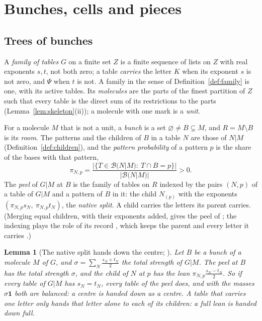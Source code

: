\documentclass[11pt]{article}
\theoremstyle{plain}
\newtheorem{lemma}[prop]{Lemma}
\theoremstyle{definition}
\theoremstyle{remark}
\newcommand{\cB}{\mathcal B}
\begin{document}
\section{Bunches, cells and pieces}\label{sec:bunches}

\subsection{Trees of bunches}

A \emph{family of tables} $G$ on a finite set $Z$ is a finite sequence of lists on $Z$ with real exponents $s,t$, not both zero; a table \emph{carries} the letter $K$ when its exponent $s$ is not zero, and $\Psi$ when $t$ is not. A family in the sense of Definition~\ref{def:family} is one, with its active tables. Its \emph{molecules} are the parts of the finest partition of $Z$ such that every table is the direct sum of its restrictions to the parts (Lemma~\ref{lem:skeleton}(ii)); a molecule with one mark is a \emph{unit}.

For a molecule $M$ that is not a unit, a \emph{bunch} is a set $\varnothing\neq B\subsetneq M$, and $R=M\setminus B$ is its \emph{room}. The patterns and the children of $B$ in a table $N$ are those of $N|M$ (Definition~\ref{def:children}), and the \emph{pattern probability} of a pattern $p$ is the share of the bases with that pattern,
\[
\pi_{N,p}=\frac{|\{T\in\cB(N|M):\ T\cap B=p\}|}{|\cB(N|M)|}>0 .
\]
The \emph{peel} of $G|M$ at $B$ is the family of tables on $R$ indexed by the pairs $(N,p)$ of a table of $G|M$ and a pattern of $B$ in it: the child $N_{(p)}$ with the exponents $(\pi_{N,p}s_N,\ \pi_{N,p}t_N)$, the \emph{native split}. A child carries the letters its parent carries. (Merging equal children, with their exponents added, gives the peel of \cite[Def.~14.1, p.~81]{F}; the indexing plays the role of its record \cite[Def.~14.2, p.~81]{F}, which keeps the parent and every letter it carries \cite[Prop.~14.3, p.~81]{F}.)

\begin{lemma}[The native split hands down the centre; {\cite[Prop.~12.24, p.~75]{F}}]\label{lem:hereditary}
Let $B$ be a bunch of a molecule $M$ of $G$, and $\sigma=\sum_N\frac{s_N+t_N}2$ the total strength of $G|M$. The peel at $B$ has the total strength $\sigma$, and the child of $N$ at $p$ has the lean $\pi_{N,p}\frac{s_N-t_N}2$. So if every table of $G|M$ has $s_N=t_N$, every table of the peel does, and with the masses $\sigma\mathbf 1$ both are balanced: a centre is handed down as a centre. A table that carries one letter only hands that letter alone to each of its children: a full lean is handed down full.
\end{lemma}
\end{document}
